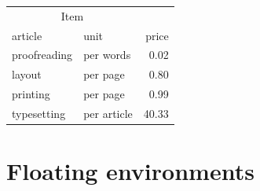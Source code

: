 \begin{frame}[fragile]
\begin{multicols}{2}
\columnbreak{}

\begin{tabular}[t]{llr}
\multicolumn{2}{c}{Item} &  \\
\cline{1-2}
article & unit & price \\
\hline
proofreading & per words & 0.02 \\
layout & per page & 0.80 \\
printing & per page & 0.99 \\
typesetting & per article & 40.33 \\
\end{tabular}

%

\end{multicols}
\end{frame}


\section{Floating environments}

